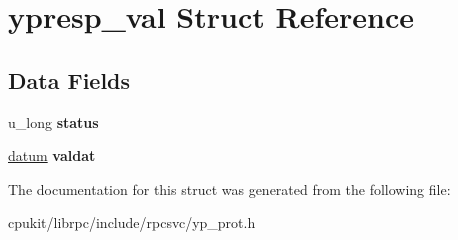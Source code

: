 \hypertarget{structypresp__val}{}\section{ypresp\+\_\+val Struct Reference}
\label{structypresp__val}
\subsection*{Data Fields}
\begin{DoxyCompactItemize}
\item 
\mbox{\label{structypresp__val_a5fc4fa4785652771eb436b82e06489f1}} 
u\+\_\+long {\bfseries status}
\item 
\mbox{\label{structypresp__val_a5da3c79b4abedf5b4a07eea6c152a8bd}} 
\mbox{\hyperlink{structdatum}{datum}} {\bfseries valdat}
\end{DoxyCompactItemize}


The documentation for this struct was generated from the following file\+:\begin{DoxyCompactItemize}
\item 
cpukit/librpc/include/rpcsvc/yp\+\_\+prot.\+h\end{DoxyCompactItemize}
